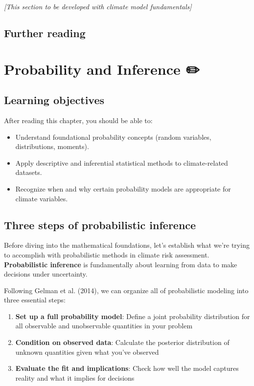 \documentclass[
  letterpaper,
  DIV=11,
  numbers=noendperiod]{scrreprt}
\providecommand{\tightlist}{%
  \setlength{\itemsep}{0pt}\setlength{\parskip}{0pt}}
\begin{document}
\emph{{[}This section to be developed with climate model
fundamentals{]}}

\section*{Further reading}\label{further-reading-1}


\chapter{Probability and Inference ✏️}\label{probability-and-inference}

\section*{Learning objectives}\label{learning-objectives-1}


After reading this chapter, you should be able to:

\begin{itemize}
\tightlist
\item
  Understand foundational probability concepts (random variables,
  distributions, moments).
\item
  Apply descriptive and inferential statistical methods to
  climate-related datasets.
\item
  Recognize when and why certain probability models are appropriate for
  climate variables.
\end{itemize}

\section{Three steps of probabilistic
inference}\label{three-steps-of-probabilistic-inference}

Before diving into the mathematical foundations, let's establish what
we're trying to accomplish with probabilistic methods in climate risk
assessment. \textbf{Probabilistic inference} is fundamentally about
learning from data to make decisions under uncertainty.

Following Gelman et al. (2014), we can organize all of probabilistic
modeling into three essential steps:

\begin{enumerate}
\def\labelenumi{\arabic{enumi}.}
\tightlist
\item
  \textbf{Set up a full probability model}: Define a joint probability
  distribution for all observable and unobservable quantities in your
  problem
\item
  \textbf{Condition on observed data}: Calculate the posterior
  distribution of unknown quantities given what you've observed
\item
  \textbf{Evaluate the fit and implications}: Check how well the model
  captures reality and what it implies for decisions
\end{enumerate}
\end{document}
